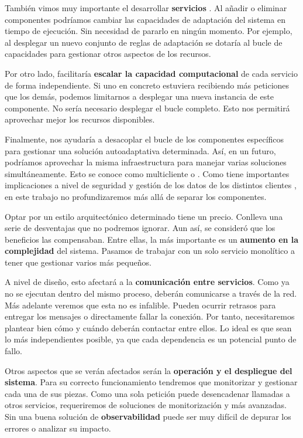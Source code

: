 También vimos muy importante el desarrollar \textbf{servicios }. Al añadir o eliminar componentes podríamos cambiar las capacidades de adaptación del sistema en tiempo de ejecución. Sin necesidad de pararlo en ningún momento. Por ejemplo, al desplegar un nuevo conjunto de reglas de adaptación se dotaría al bucle de capacidades para gestionar otros aspectos de los recursos.

Por otro lado, facilitaría \textbf{escalar la capacidad computacional} de cada servicio de forma independiente. Si uno en concreto estuviera recibiendo más peticiones que los demás, podemos limitarnos a desplegar una nueva instancia de este componente. No sería necesario desplegar el bucle completo. Esto nos permitirá aprovechar mejor los recursos disponibles.

Finalmente, nos ayudaría a desacoplar el bucle de los componentes específicos para gestionar una solución autoadaptativa determinada. Así, en un futuro, podríamos aprovechar la misma infraestructura para manejar varias soluciones simultáneamente. Esto se conoce como multicliente o \textbf{}. Como tiene importantes implicaciones a nivel de seguridad y gestión de los datos de los distintos clientes \cite{aljahdaliMultitenancyCloudComputing2014}, en este trabajo no profundizaremos más allá de separar los componentes.

Optar por un estilo arquitectónico determinado tiene un precio. Conlleva una serie de desventajas que no podremos ignorar. Aun así, se consideró que los beneficios las compensaban. Entre ellas, la más importante es un \textbf{aumento en la complejidad} del sistema. \cite{newmanBuildingMicroservicesDesigning2021} Pasamos de trabajar con un solo servicio monolítico a tener que gestionar varios más pequeños.

A nivel de diseño, esto afectará a la \textbf{comunicación entre servicios}. Como ya no se ejecutan dentro del mismo proceso, deberán comunicarse a través de la red. Más adelante veremos que esta no es infalible. \cite{jausovecFallaciesDistributedSystems2020} Pueden ocurrir retrasos para entregar los mensajes o directamente fallar la conexión. Por tanto, necesitaremos plantear bien cómo y cuándo deberán contactar entre ellos. Lo ideal es que sean lo más independientes posible, ya que cada dependencia es un potencial punto de fallo.

Otros aspectos que se verán afectados serán la \textbf{operación y el despliegue del sistema}. Para su correcto funcionamiento tendremos que monitorizar y gestionar cada una de sus piezas. Como una sola petición puede desencadenar llamadas a otros servicios, requeriremos de soluciones de monitorización y  más avanzadas. \cite{parkerProblemDistributedTracing2020} Sin una buena solución de \textbf{observabilidad} puede ser muy difícil de depurar los errores o analizar su impacto.

